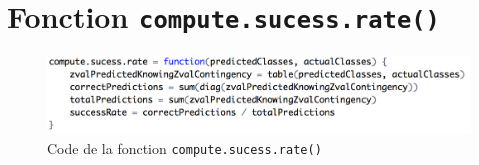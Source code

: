 \documentclass[a4paper,10pt]{report}
\begin{document}
\appendix









\chapter{Fonction \texttt{compute.sucess.rate()}}
\begin{figure}[H]
	\centering
	\captionsetup{justification=centering, margin=4cm}
	\includegraphics[width=.9\linewidth]{img/annexe-1-compute-sucess-rate}
	\caption{\small Code de la fonction \texttt{compute.sucess.rate()}}	
	\label{fig:annexe-1-compute-sucess-rate}%
\end{figure}
\end{document}
